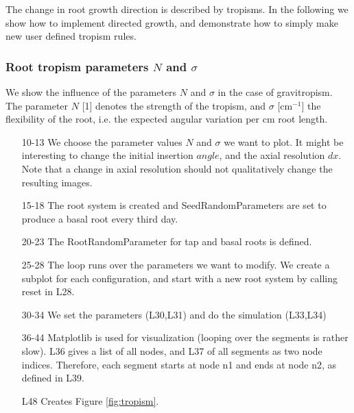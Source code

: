 The change in root growth direction is described by tropisms. In the following we show how to implement directed growth, and demonstrate how to simply make new user defined tropism rules. 


\subsubsection*{Root tropism parameters $N$ and $\sigma$} 

We show the influence of the parameters $N$ and $\sigma$ in the case of gravitropism. The parameter $N$ [1] denotes the strength of the tropism, and $\sigma$ [cm$^{-1}$] the flexibility of the root, i.e. the expected angular variation per cm root length. 



\begin{itemize}
\item[10-13] We choose the parameter values $N$ and $\sigma$ we want to plot. It might be interesting to change the initial insertion $angle$, and the axial resolution $dx$. Note that a change in axial resolution should not qualitatively change the resulting images.

\item[15-18] The root system is created and SeedRandomParameters are set to produce a basal root every third day. 

\item[20-23] The RootRandomParameter for tap and basal roots is defined.

\item[25-28] The loop runs over the parameters we want to modify. We create a subplot for each configuration, and start with a new root system by calling reset in L28.

\item[30-34] We set the parameters (L30,L31) and do the simulation (L33,L34)

\item[36-44] Matplotlib is used for visualization (looping over the segments is rather slow). L36 gives a list of all nodes, and L37 of all segments as two node indices. Therefore, each segment starts at node n1 and ends at node n2, as defined in L39.

\item[L48] Creates Figure \ref{fig:tropism}.
\end{itemize}

